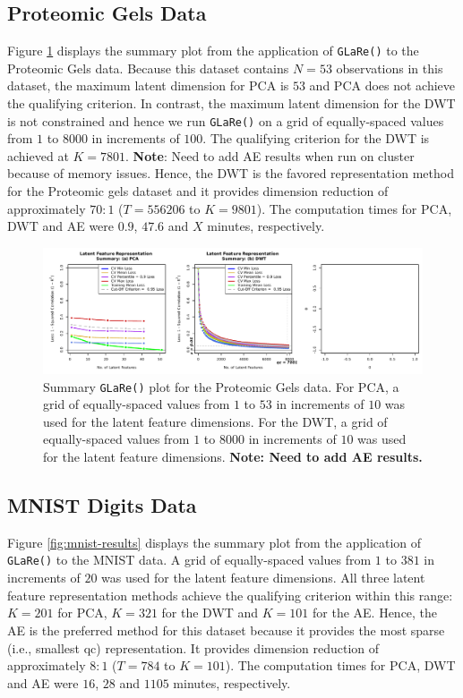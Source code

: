 \subsection{Proteomic Gels Data}\label{sec:gels-reults}

Figure \ref{fig:gels-results} displays the summary plot from the application of \texttt{GLaRe()} to the Proteomic Gels data.
Because this dataset contains $N=53$ observations in this dataset, the maximum latent dimension for PCA is $53$ and PCA does not achieve the qualifying criterion.
In contrast, the maximum latent dimension for the DWT is not constrained and hence we run \texttt{GLaRe()} on a grid of equally-spaced values from $1$ to $8000$ in increments of $100$.
The qualifying criterion for the DWT is achieved at $K=7801$.
{\color{purple}\textbf{Note}: Need to add AE results when run on cluster because of memory issues.}
Hence, the DWT is the favored representation method for the Proteomic gels dataset and it provides dimension reduction of approximately $70:1$ ($T = 556206$ to $K = 9801$).
The computation times for PCA, DWT and AE were $0.9$, $47.6$ and {\color{purple}$X$} minutes, respectively.


\begin{figure}
    \centering
    \includegraphics[width=1\linewidth]{figures/gels-results.pdf}
    \caption{Summary \texttt{GLaRe()} plot for the Proteomic Gels data. For PCA, a grid of equally-spaced values from $1$ to $53$ in increments of $10$ was used for the latent feature dimensions.
    For the DWT,  a grid of equally-spaced values from $1$ to $8000$ in increments of $10$ was used for the latent feature dimensions. {\color{purple} \textbf{Note: Need to add AE results.}}}
    \label{fig:gels-results}
\end{figure}


\subsection{MNIST Digits Data}\label{sec:mnist-reults}

Figure \ref{fig:mnist-results} displays the summary plot from the application of \texttt{GLaRe()} to the MNIST data.
A grid of equally-spaced values from $1$ to $381$ in increments of $20$ was used for the latent feature dimensions.
All three latent feature representation methods achieve the qualifying criterion within this range: $K = 201$ for PCA, $K = 321$ for the DWT and $K = 101$ for the AE.
Hence, the AE is the preferred method for this dataset because it provides the most sparse (i.e., smallest qc) representation.
It provides dimension reduction of approximately $8:1$ ($T = 784$ to $K = 101$).
The computation times for PCA, DWT and AE were $16$, $28$ and $1105$ minutes, respectively.

